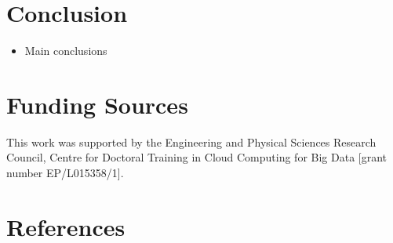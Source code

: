 \documentclass[final,3p,times,twocolumn,numbers]{elsarticle}
\begin{document}
\section{Conclusion}
\label{sec:conclusion}

\begin{itemize}
	\item Main conclusions
\end{itemize}

\section{Funding Sources}

This work was supported by the Engineering and Physical Sciences Research Council, Centre for Doctoral Training in Cloud Computing for Big Data [grant number EP/L015358/1].






   
  \section*{References}
  


%
%
%
\end{document}
